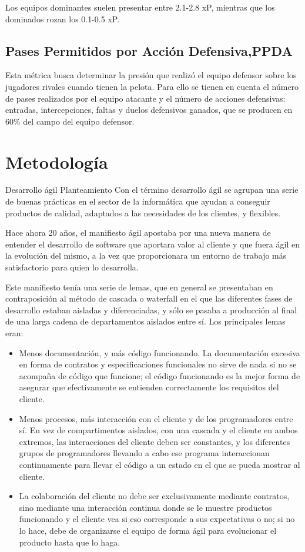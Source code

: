 Los equipos dominantes suelen presentar entre 2.1-2.8 xP, mientras 
que los dominados rozan los 0.1-0.5 xP. 

\subsection{Pases Permitidos por Acción Defensiva,PPDA}
Esta métrica busca determinar la presión que realizó el 
equipo defensor sobre los jugadores rivales cuando 
tienen la pelota. Para ello se tienen en cuenta el número 
de pases realizados por el equipo atacante y el número de 
acciones defensivas: entradas, intercepciones, faltas y duelos 
defensivos ganados, que se producen en 60\% del campo del 
equipo defensor.

\section{Metodología}

Desarrollo ágil
Planteamiento
Con el término desarrollo ágil se agrupan una serie de buenas prácticas en 
el sector de la informática que ayudan a conseguir productos de calidad, 
adaptados a las necesidades de los clientes, y flexibles. 

Hace ahora 20 años, el manifiesto ágil apostaba por una nueva manera de 
entender el desarrollo de software que aportara valor al cliente y que fuera 
ágil en la evolución del mismo, a la vez que proporcionara un entorno de 
trabajo más satisfactorio para quien lo desarrolla.

Este manifiesto tenía una serie de lemas, que en general se presentaban en 
contraposición al método de cascada o waterfall en el que las diferentes 
fases de desarrollo estaban aisladas y diferenciadas, y sólo se pasaba a 
producción al final de una larga cadena de departamentos aislados entre sí. 
Los principales lemas eran:
\begin{itemize}
    \item Menos documentación, y más código funcionando. La documentación excesiva en 
    forma de contratos y especificaciones funcionales no sirve de nada si no se 
    acompaña de código que funcione; el código funcionando es la mejor forma de 
    asegurar que efectivamente se entienden correctamente los requisitos del 
    cliente.
    \item Menos procesos, más interacción con el cliente y de los 
    programadores entre sí. En vez de compartimentos aislados, con una 
    cascada y el cliente en ambos extremos, las interacciones del cliente 
    deben ser constantes, y los diferentes grupos de programadores llevando 
    a cabo ese programa interaccionan continuamente para llevar el código a 
    un estado en el que se pueda mostrar al cliente.
    \item La colaboración del cliente no debe ser exclusivamente mediante 
    contratos, sino mediante una interacción continua donde se le 
    muestre productos funcionando y el cliente vea si eso corresponde a sus 
    expectativas o no; si no lo hace, debe de organizarse el equipo de forma 
    ágil para evolucionar el producto hasta que lo haga.
\end{itemize}


